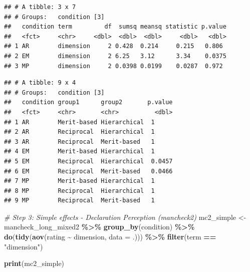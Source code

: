 \documentclass[
]{article}
\newenvironment{Shaded}{\begin{snugshade}}{\end{snugshade}}
\newcommand{\AttributeTok}[1]{\textcolor[rgb]{0.13,0.29,0.53}{#1}}
\newcommand{\CommentTok}[1]{\textcolor[rgb]{0.56,0.35,0.01}{\textit{#1}}}
\newcommand{\ConstantTok}[1]{\textcolor[rgb]{0.56,0.35,0.01}{#1}}
\newcommand{\FunctionTok}[1]{\textcolor[rgb]{0.13,0.29,0.53}{\textbf{#1}}}
\newcommand{\NormalTok}[1]{#1}
\newcommand{\OtherTok}[1]{\textcolor[rgb]{0.56,0.35,0.01}{#1}}
\newcommand{\SpecialCharTok}[1]{\textcolor[rgb]{0.81,0.36,0.00}{\textbf{#1}}}
\newcommand{\StringTok}[1]{\textcolor[rgb]{0.31,0.60,0.02}{#1}}
\begin{document}
\begin{verbatim}
## # A tibble: 3 x 7
## # Groups:   condition [3]
##   condition term         df  sumsq meansq statistic p.value
##   <fct>     <chr>     <dbl>  <dbl>  <dbl>     <dbl>   <dbl>
## 1 AR        dimension     2 0.428  0.214     0.215   0.806 
## 2 EM        dimension     2 6.25   3.12      3.34    0.0375
## 3 MP        dimension     2 0.0398 0.0199    0.0287  0.972
\end{verbatim}

\begin{Shaded}
\end{Shaded}

\begin{verbatim}
## # A tibble: 9 x 4
## # Groups:   condition [3]
##   condition group1      group2       p.value
##   <fct>     <chr>       <chr>          <dbl>
## 1 AR        Merit-based Hierarchical  1     
## 2 AR        Reciprocal  Hierarchical  1     
## 3 AR        Reciprocal  Merit-based   1     
## 4 EM        Merit-based Hierarchical  1     
## 5 EM        Reciprocal  Hierarchical  0.0457
## 6 EM        Reciprocal  Merit-based   0.0466
## 7 MP        Merit-based Hierarchical  1     
## 8 MP        Reciprocal  Hierarchical  1     
## 9 MP        Reciprocal  Merit-based   1
\end{verbatim}

\begin{Shaded}
\begin{Highlighting}[]
\CommentTok{\# Step 3: Simple effects {-} Declaration Perception (mancheck2)}
\NormalTok{mc2\_simple }\OtherTok{\textless{}{-}}\NormalTok{ mancheck\_long\_mixed2 }\SpecialCharTok{\%\textgreater{}\%}
  \FunctionTok{group\_by}\NormalTok{(condition) }\SpecialCharTok{\%\textgreater{}\%}
  \FunctionTok{do}\NormalTok{(}\FunctionTok{tidy}\NormalTok{(}\FunctionTok{aov}\NormalTok{(rating }\SpecialCharTok{\textasciitilde{}}\NormalTok{ dimension, }\AttributeTok{data =}\NormalTok{ .))) }\SpecialCharTok{\%\textgreater{}\%}
  \FunctionTok{filter}\NormalTok{(term }\SpecialCharTok{==} \StringTok{"dimension"}\NormalTok{)}

\FunctionTok{print}\NormalTok{(mc2\_simple)}
\end{Highlighting}
\end{Shaded}
\end{document}

